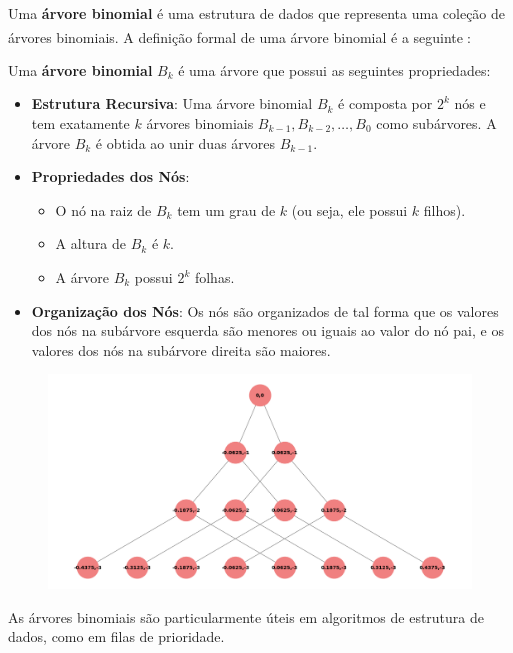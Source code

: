 \documentclass[12pt, a4paper]{scrreprt}
\begin{document}
Uma \textbf{árvore binomial} é uma estrutura de dados que representa uma coleção de árvores binomiais. A definição formal de uma árvore binomial é a seguinte\textsuperscript{\cite{definicaoarvorebinomialEllis} \cite{definicaoarvorebinomialTarjan}}:

Uma \textbf{árvore binomial} \( B_k \) é uma árvore que possui as seguintes propriedades:

\begin{itemize}
    \item \textbf{Estrutura Recursiva}: Uma árvore binomial \( B_k \) é composta por \( 2^k \) nós e tem exatamente \( k \) árvores binomiais \( B_{k-1}, B_{k-2}, \ldots, B_0 \) como subárvores. A árvore \( B_k \) é obtida ao unir duas árvores \( B_{k-1} \).
    
    \item \textbf{Propriedades dos Nós}: 
    \begin{itemize}
        \item O nó na raiz de \( B_k \) tem um grau de \( k \) (ou seja, ele possui \( k \) filhos).
        \item A altura de \( B_k \) é \( k \).
        \item A árvore \( B_k \) possui \( 2^k \) folhas.
    \end{itemize}
    
    \item \textbf{Organização dos Nós}: Os nós são organizados de tal forma que os valores dos nós na subárvore esquerda são menores ou iguais ao valor do nó pai, e os valores dos nós na subárvore direita são maiores.
\end{itemize}

\begin{figure}[h]
    \centering
    \includegraphics[width=.72\textwidth]{src/arvore_binomial_ordem_3.png}
    \label{fig:exemplo de árvore binomial}
\end{figure}

As árvores binomiais são particularmente úteis em algoritmos de estrutura de dados, como em filas de prioridade.
\end{document}
